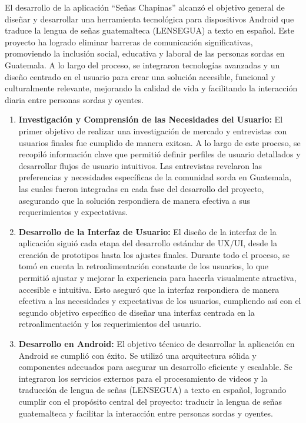 El desarrollo de la aplicación ``Señas Chapinas''  alcanzó el objetivo general de diseñar y desarrollar una herramienta tecnológica para dispositivos Android que traduce la lengua de señas guatemalteca (LENSEGUA) a texto en español. Este proyecto ha logrado eliminar barreras de comunicación significativas, promoviendo la inclusión social, educativa y laboral de las personas sordas en Guatemala. A lo largo del proceso, se integraron tecnologías avanzadas y un diseño centrado en el usuario para crear una solución accesible, funcional y culturalmente relevante, mejorando la calidad de vida y facilitando la interacción diaria entre personas sordas y oyentes.

\begin{enumerate}
    \item \textbf{Investigación y Comprensión de las Necesidades del Usuario:} El primer objetivo de realizar una investigación de mercado y entrevistas con usuarios finales fue cumplido de manera exitosa. A lo largo de este proceso, se recopiló información clave que permitió definir perfiles de usuario detallados y desarrollar flujos de usuario intuitivos. Las entrevistas revelaron las preferencias y necesidades específicas de la comunidad sorda en Guatemala, las cuales fueron integradas en cada fase del desarrollo del proyecto, asegurando que la solución respondiera de manera efectiva a sus requerimientos y expectativas.
    
    \item \textbf{Desarrollo de la Interfaz de Usuario:} El diseño de la interfaz de la aplicación siguió cada etapa del desarrollo estándar de UX/UI, desde la creación de prototipos hasta los ajustes finales. Durante todo el proceso, se tomó en cuenta la retroalimentación constante de los usuarios, lo que permitió ajustar y mejorar la experiencia para hacerla visualmente atractiva, accesible e intuitiva. Esto aseguró que la interfaz respondiera de manera efectiva a las necesidades y expectativas de los usuarios, cumpliendo así con el segundo objetivo específico de diseñar una interfaz centrada en la retroalimentación y los requerimientos del usuario.
    
    \item \textbf{Desarrollo en Android:}  El objetivo técnico de desarrollar la aplicación en Android se cumplió con éxito. Se utilizó una arquitectura sólida y componentes adecuados para asegurar un desarrollo eficiente y escalable. Se  integraron los servicios externos para el procesamiento de videos y la traducción de lengua de señas (LENSEGUA) a texto en español, logrando cumplir con el propósito central del proyecto: traducir la lengua de señas guatemalteca y facilitar la interacción entre personas sordas y oyentes.


    
\end{enumerate}

